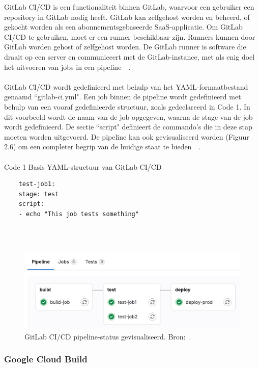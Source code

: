 GitLab CI/CD is een functionaliteit binnen GitLab, waarvoor een gebruiker een repository in GitLab nodig heeft. GitLab kan zelfgehost worden en beheerd, of gekocht worden als een abonnementsgebaseerde SaaS-applicatie. Om GitLab CI/CD te gebruiken, moet er een runner beschikbaar zijn. Runners kunnen door GitLab worden gehost of zelfgehost worden. De GitLab runner is software die draait op een server en communiceert met de GitLab-instance, met als enig doel het uitvoeren van jobs in een pipeline~\autocite{gitlabRunner}~\autocite{gitlabCi}. 
\\\\
GitLab CI/CD wordt gedefinieerd met behulp van het YAML-formaatbestand genaamd ``gitlab-ci.yml". Een job binnen de pipeline wordt gedefinieerd met behulp van een vooraf gedefinieerde structuur, zoals gedeclareerd in Code 1. In dit voorbeeld wordt de naam van de job opgegeven, waarna de stage van de job wordt gedefinieerd. De sectie ``script" definieert de commando's die in deze stap moeten worden uitgevoerd. De pipeline kan ook gevisualiseerd worden (Figuur 2.6) om een completer begrip van de huidige staat te bieden~\autocite{gitlabPipelines}~\autocite{gitlabRunner}.
\\\\
Code 1 Basis YAML-structuur van GitLab CI/CD
\begin{verbatim}
    test-job1:
    stage: test
    script:
    - echo "This job tests something"
\end{verbatim}
\\\\
\begin{figure}{\textwidth}
    \centering
    \includegraphics[width=0.8\linewidth]{Foto's/pipeline_graph_v17_9.png}
    \caption{GitLab CI/CD pipeline-status gevisualiseerd. Bron:~\autocite{gitlabPipelines}.}
    \label{fig:pipeline-status}
\end{figure}

\subsubsection{Google Cloud Build}

